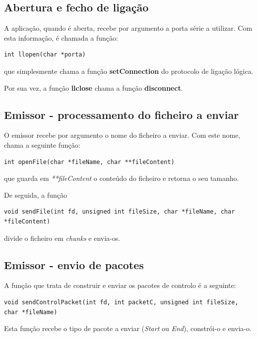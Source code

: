 \documentclass[a4paper,11pt]{article}
\begin{document}
\subsection{Abertura e fecho de ligação}

A aplicação, quando é aberta, recebe por argumento a porta série a utilizar. Com esta informação, é chamada a função:

\begin{lstlisting}
int llopen(char *porta)
\end{lstlisting}

que simplesmente chama a função \textbf{setConnection} do protocolo de ligação lógica.

Por sua vez, a função \textbf{llclose} chama a função \textbf{disconnect}.

\subsection{Emissor - processamento do ficheiro a enviar}

O emissor recebe por argumento o nome do ficheiro a enviar. Com este nome, chama a seguinte função:

\begin{lstlisting}
int openFile(char *fileName, char **fileContent)
\end{lstlisting}

que guarda em \textit{**fileContent} o conteúdo do ficheiro e retorna o seu tamanho.

De seguida, a função

\begin{lstlisting}
void sendFile(int fd, unsigned int fileSize, char *fileName, char *fileContent)
\end{lstlisting}

divide o ficheiro em \textit{chunks} e envia-os.

\subsection{Emissor - envio de pacotes}

A função que trata de construir e enviar os pacotes de controlo é a seguinte:

\begin{lstlisting}
void sendControlPacket(int fd, int packetC, unsigned int fileSize, char *fileName)
\end{lstlisting}

Esta função recebe o tipo de pacote a enviar (\textit{Start} ou \textit{End}), constrói-o e envia-o. 
\end{document}
